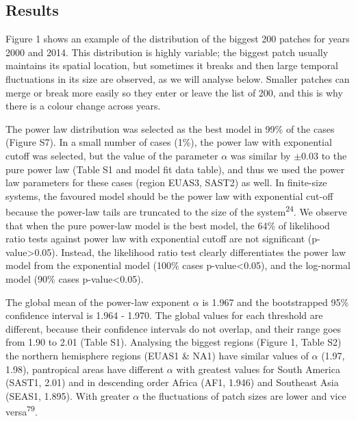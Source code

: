 \documentclass[]{article}
\begin{document}
\subsection{Results}\label{results}

Figure 1 shows an example of the distribution of the biggest 200 patches
for years 2000 and 2014. This distribution is highly variable; the
biggest patch usually maintains its spatial location, but sometimes it
breaks and then large temporal fluctuations in its size are observed, as
we will analyse below. Smaller patches can merge or break more easily so
they enter or leave the list of 200, and this is why there is a colour
change across years.

The power law distribution was selected as the best model in 99\% of the
cases (Figure S7). In a small number of cases (1\%), the power law with
exponential cutoff was selected, but the value of the parameter
\(\alpha\) was similar by \(\pm 0.03\) to the pure power law (Table S1
and model fit data table), and thus we used the power law parameters for
these cases (region EUAS3, SAST2) as well. In finite-size systems, the
favoured model should be the power law with exponential cut-off because
the power-law tails are truncated to the size of the
system\textsuperscript{24}. We observe that when the pure power-law
model is the best model, the 64\% of likelihood ratio tests against
power law with exponential cutoff are not significant
(p-value\textgreater{}0.05). Instead, the likelihood ratio test clearly
differentiates the power law model from the exponential model (100\%
cases p-value\textless{}0.05), and the log-normal model (90\% cases
p-value\textless{}0.05).

The global mean of the power-law exponent \(\alpha\) is 1.967 and the
bootstrapped 95\% confidence interval is 1.964 - 1.970. The global
values for each threshold are different, because their confidence
intervals do not overlap, and their range goes from 1.90 to 2.01 (Table
S1). Analysing the biggest regions (Figure 1, Table S2) the northern
hemisphere regions (EUAS1 \& NA1) have similar values of \(\alpha\)
(1.97, 1.98), pantropical areas have different \(\alpha\) with greatest
values for South America (SAST1, 2.01) and in descending order Africa
(AF1, 1.946) and Southeast Asia (SEAS1, 1.895). With greater \(\alpha\)
the fluctuations of patch sizes are lower and vice
versa\textsuperscript{79}.
\end{document}
